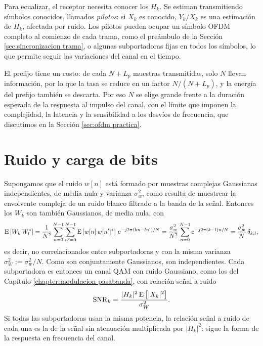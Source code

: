 Para ecualizar, el receptor necesita conocer los $H_k$. Se estiman transmitiendo símbolos conocidos, llamados \emph{pilotos}: si $X_k$ es conocido, $Y_k/X_k$ es una estimación de $H_k$, afectada por ruido. Los pilotos pueden ocupar un símbolo OFDM completo al comienzo de cada trama, como el preámbulo de la Sección \ref{sec:sincronizacion trama}, o algunas subportadoras fijas en todos los símbolos, lo que permite seguir las variaciones del canal en el tiempo.

El prefijo tiene un costo: de cada $N+L_p$ muestras transmitidas, solo $N$ llevan información, por lo que la tasa se reduce en un factor $N/(N+L_p)$, y la energía del prefijo también se descarta. Por eso $N$ se elige grande frente a la duración esperada de la respuesta al impulso del canal, con el límite que imponen la complejidad, la latencia y la sensibilidad a los desvíos de frecuencia, que discutimos en la Sección \ref{sec:ofdm practica}.

\section{Ruido y carga de bits}\label{sec:carga bits}

Supongamos que el ruido $w[n]$ está formado por muestras complejas Gaussianas independientes, de media nula y varianza $\sigma_w^2$, como resulta de muestrear la envolvente compleja de un ruido blanco filtrado a la banda de la señal. Entonces los $W_k$ son también Gaussianos, de media nula, con
\begin{equation*}
    \mathrm{E}\left[W_k\,W_l^*\right] = \frac{1}{N^2}\sum_{n=0}^{N-1}\sum_{n'=0}^{N-1}\mathrm{E}\left[w[n]\,w[n']^*\right]\,\mathrm{e}^{-j2\pi (kn-ln')/N} = \frac{\sigma_w^2}{N^2}\sum_{n=0}^{N-1}\mathrm{e}^{-j2\pi(k-l)n/N} = \frac{\sigma_w^2}{N}\,\delta_{k,l},
\end{equation*}
es decir, no correlacionados entre subportadoras y con la misma varianza $\sigma_W^2:=\sigma_w^2/N$. Como son conjuntamente Gaussianos, son independientes. Cada subportadora es entonces un canal QAM con ruido Gaussiano, como los del Capítulo \ref{chapter:modulacion pasabanda}, con relación señal a ruido
\begin{equation}\label{eq:snr subportadora}
    \mathrm{SNR}_k = \frac{|H_k|^2\,\mathrm{E}\left[|X_k|^2\right]}{\sigma_W^2}.
\end{equation}
Si todas las subportadoras usan la misma potencia, la relación señal a ruido de cada una es la de la señal sin atenuación multiplicada por $|H_k|^2$: sigue la forma de la respuesta en frecuencia del canal.

